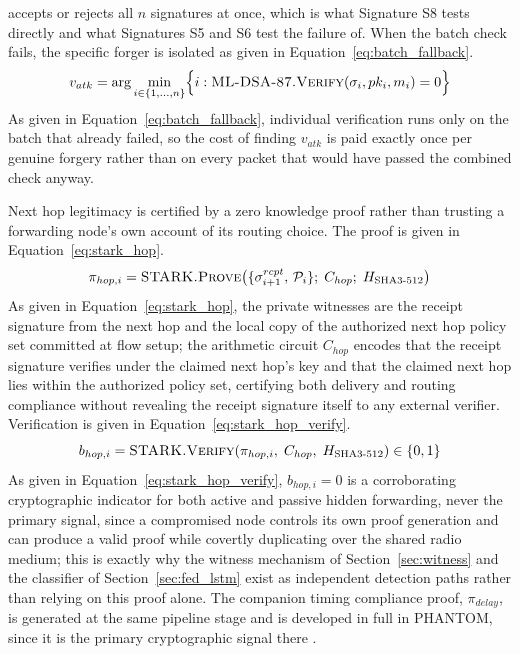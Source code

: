 \documentclass[final,5p,twocolumn]{elsarticle}
\theoremstyle{remark}
\theoremstyle{plain}
\begin{document}
accepts or rejects all $n$ signatures at once, which is what Signature S8
tests directly and what Signatures S5 and S6 test the failure of. When the
batch check fails, the specific forger is isolated as given in
Equation~\eqref{eq:batch_fallback}.
\begin{equation}
	v_{atk} = \arg\min_{i \in \{1,\ldots,n\}} \Bigl\{i : \textsc{ML-DSA-87.Verify}(\sigma_i, pk_i, m_i) = 0\Bigr\}
	\label{eq:batch_fallback}
\end{equation}
As given in Equation~\eqref{eq:batch_fallback}, individual verification
runs only on the batch that already failed, so the cost of finding $v_{atk}$
is paid exactly once per genuine forgery rather than on every packet that
would have passed the combined check anyway.

Next hop legitimacy is certified by a zero knowledge proof rather than
trusting a forwarding node's own account of its routing choice. The proof
is given in Equation~\eqref{eq:stark_hop}.
\begin{equation}
	\pi_{hop,i} = \textsc{STARK.Prove}\!\left(\{\sigma^{rcpt}_{i+1},\, \mathcal{P}_i\};\; C_{hop};\; H_{\text{SHA3-512}}\right)
	\label{eq:stark_hop}
\end{equation}
As given in Equation~\eqref{eq:stark_hop}, the private witnesses are the
receipt signature from the next hop and the local copy of the authorized
next hop policy set committed at flow setup; the arithmetic circuit $C_{hop}$
encodes that the receipt signature verifies under the claimed next hop's key
and that the claimed next hop lies within the authorized policy set,
certifying both delivery and routing compliance without revealing the
receipt signature itself to any external verifier. Verification is given in
Equation~\eqref{eq:stark_hop_verify}.
\begin{equation}
	b_{hop,i} = \textsc{STARK.Verify}\!\left(\pi_{hop,i},\; C_{hop},\; H_{\text{SHA3-512}}\right) \in \{0, 1\}
	\label{eq:stark_hop_verify}
\end{equation}
As given in Equation~\eqref{eq:stark_hop_verify}, $b_{hop,i}{=}0$ is a
corroborating cryptographic indicator for both active and passive hidden
forwarding, never the primary signal, since a compromised node controls its
own proof generation and can produce a valid proof while covertly
duplicating over the shared radio medium; this is exactly why the witness
mechanism of Section~\ref{sec:witness} and the classifier of
Section~\ref{sec:fed_lstm} exist as independent detection paths rather than
relying on this proof alone. The companion timing compliance proof,
$\pi_{delay}$, is generated at the same pipeline stage and is developed in
full in PHANTOM, since it is the primary cryptographic signal there
\cite{Phantom2026}.
\end{document}

